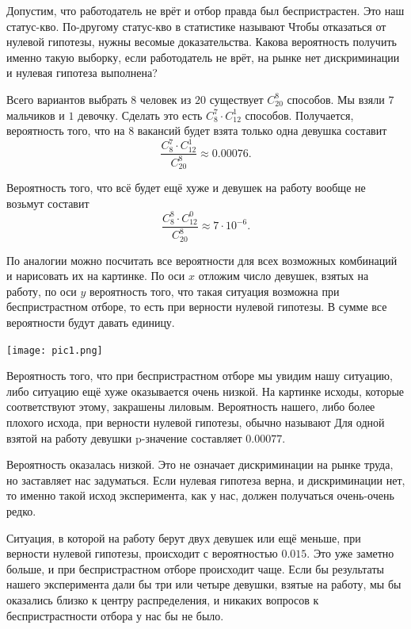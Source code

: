 \documentclass[12pt, a4paper, oneside]{article}
\begin{document}
Допустим, что работодатель не врёт и отбор правда был беспристрастен. Это наш статус-кво. По-другому статус-кво в статистике называют  Чтобы отказаться от нулевой гипотезы, нужны весомые доказательства. Какова вероятность получить именно такую выборку, если работодатель не врёт, на рынке нет дискриминации и нулевая гипотеза выполнена?

Всего вариантов выбрать $8$ человек из $20$ существует $C_{20}^8$ способов. Мы взяли $7$ мальчиков и $1$ девочку. Сделать это есть $C_8^7 \cdot C_{12}^1$ способов. Получается, вероятность того, что на $8$ вакансий будет взята только одна девушка составит \[ \frac{C_8^7 \cdot C_{12}^1}{C_{20}^8} \approx 0.00076. \] 

Вероятность того, что всё будет ещё хуже и девушек на работу вообще не возьмут составит \[ \frac{C_8^8 \cdot C_{12}^0}{C_{20}^8} \approx 7 \cdot 10^{-6}. \] 

По аналогии можно посчитать все вероятности для всех возможных комбинаций и нарисовать их на картинке. По оси $x$ отложим число девушек, взятых на работу, по оси $y$ вероятность того, что такая ситуация возможна при беспристрастном отборе, то есть при верности нулевой гипотезы. В сумме все вероятности будут давать единицу. 

\begin{center} 
\texttt{[image: pic1.png]}
\end{center} 

Вероятность того, что при беспристрастном отборе мы увидим нашу ситуацию, либо ситуацию ещё хуже оказывается очень низкой. На картинке исходы, которые соответствуют этому, закрашены лиловым. Вероятность нашего, либо более плохого исхода, при верности нулевой гипотезы, обычно называют   Для одной взятой на работу девушки p-значение составляет $0.00077$.

Вероятность оказалась низкой. Это не означает дискриминации на рынке труда, но заставляет нас задуматься. Если нулевая гипотеза верна, и дискриминации нет, то именно такой исход эксперимента, как у нас, должен получаться очень-очень редко. 

Ситуация, в которой на работу берут двух девушек или ещё меньше, при верности нулевой гипотезы, происходит с вероятностью $0.015$. Это уже заметно больше, и при беспристрастном отборе происходит чаще. Если бы результаты нашего эксперимента дали бы три или четыре девушки, взятые на работу, мы бы оказались близко к центру распределения, и никаких вопросов к беспристрастности отбора у нас бы не было. 
\end{document}
